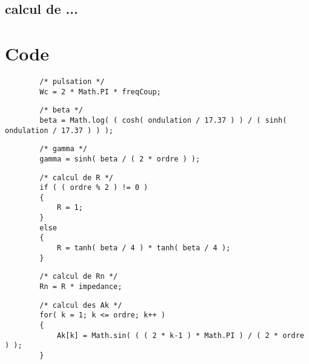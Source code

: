 \documentclass[a4paper,11pt]{report}
\begin{document}
        \paragraph{}

    \section{calcul de ... }
        \paragraph{}


\chapter{Code}
           \lstset{
                language=java, basicstyle=\ttfamily\small, columns=flexible,
                tabsize=2, extendedchars=true, showspaces=false,
                showstringspaces=false, numbers=left, numberstyle=\tiny,
                breaklines=true, breakautoindent=true, captionpos=b
            }

    \begin{lstlisting}
        /* pulsation */
        Wc = 2 * Math.PI * freqCoup;
    \end{lstlisting}


    \begin{lstlisting}
        /* beta */
        beta = Math.log( ( cosh( ondulation / 17.37 ) ) / ( sinh( ondulation / 17.37 ) ) );
    \end{lstlisting}


    \begin{lstlisting}
        /* gamma */
        gamma = sinh( beta / ( 2 * ordre ) );
    \end{lstlisting}


    \begin{lstlisting}
        /* calcul de R */
        if ( ( ordre % 2 ) != 0 )
        {
            R = 1;
        }
        else
        {
            R = tanh( beta / 4 ) * tanh( beta / 4 );
        }
    \end{lstlisting}


    \begin{lstlisting}
        /* calcul de Rn */
        Rn = R * impedance;
    \end{lstlisting}


    \begin{lstlisting}
        /* calcul des Ak */
        for( k = 1; k <= ordre; k++ )
        {
            Ak[k] = Math.sin( ( ( 2 * k-1 ) * Math.PI ) / ( 2 * ordre ) );
        }
    \end{lstlisting}
\end{document}

